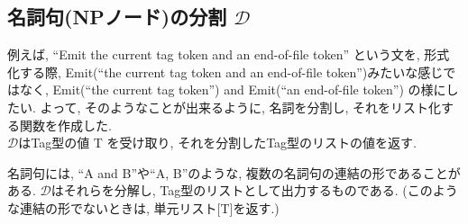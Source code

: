 \documentclass[uplatex,a4j]{jsreport}
\begin{document}

\subsection{名詞句(NPノード)の分割 $\mathcal{D}$}
例えば, ``Emit the current tag token and an end-of-file token'' という文を, 形式化する際, 
Emit(``the current tag token and an end-of-file token'')みたいな感じではなく, 
Emit(``the current tag token'') and Emit(``an end-of-file token'') の様にしたい. 
よって, そのようなことが出来るように, 名詞を分割し, それをリスト化する関数を作成した. \\

$\mathcal{D}$はTag型の値 T を受け取り, それを分割したTag型のリストの値を返す. 

名詞句には, 
``A and B''や``A, B''のような, 複数の名詞句の連結の形であることがある. 
$\mathcal{D}$はそれらを分解し, Tag型のリストとして出力するものである. 
(このような連結の形でないときは, 単元リスト[T]を返す.) 
\end{document}
